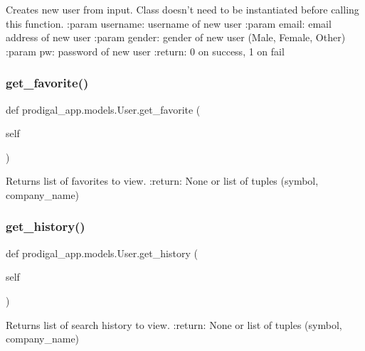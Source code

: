 \begin{DoxyVerb}Creates new user from input.
Class doesn't need to be instantiated before calling this function.
:param username: username of new user
:param email: email address of new user
:param gender: gender of new user (Male, Female, Other)
:param pw: password of new user
:return: 0 on success, 1 on fail
\end{DoxyVerb}
 \mbox{\label{classprodigal__app_1_1models_1_1_user_a038a551bcb0acf31766988d13bc69cb3}} 
\subsubsection{\texorpdfstring{get\+\_\+favorite()}{get\_favorite()}}
{\footnotesize\ttfamily def prodigal\+\_\+app.\+models.\+User.\+get\+\_\+favorite (\begin{DoxyParamCaption}\item[{}]{self }\end{DoxyParamCaption})}

\begin{DoxyVerb}Returns list of favorites to view.
:return: None or list of tuples (symbol, company_name)
\end{DoxyVerb}
 \mbox{\label{classprodigal__app_1_1models_1_1_user_a88065516192ed34c32a3222ea3812a1c}} 
\subsubsection{\texorpdfstring{get\+\_\+history()}{get\_history()}}
{\footnotesize\ttfamily def prodigal\+\_\+app.\+models.\+User.\+get\+\_\+history (\begin{DoxyParamCaption}\item[{}]{self }\end{DoxyParamCaption})}

\begin{DoxyVerb}Returns list of search history to view.
:return: None or list of tuples (symbol, company_name)
\end{DoxyVerb}
 \mbox{\label{classprodigal__app_1_1models_1_1_user_a95cf60a8cd82bf3017d8533e621dc5c2}} 
